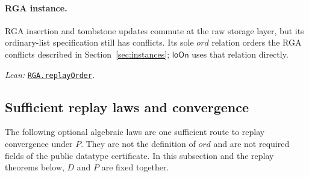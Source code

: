 \documentclass[11pt]{article}
\theoremstyle{definition}
\newcommand{\loOn}{\mathsf{loOn}}
\newcommand{\src}[2]{\href{../../#1}{\texttt{#2}}}
\newcommand{\anchor}[2]{\par\smallskip\noindent\emph{Lean: }\src{#1}{#2}.}
\begin{document}
\paragraph{RGA instance.}
RGA insertion and tombstone updates commute at the raw storage layer, but its
ordinary-list specification still has conflicts. Its sole $ord$ relation
orders the RGA conflicts described in Section~\ref{sec:instances}; $\loOn$ uses that relation
directly.
\anchor{Sal/MRDTs/Instances/RGASequential.lean}{RGA.replayOrder}

\subsection{Sufficient replay laws and convergence}

The following optional algebraic laws are one sufficient route to replay
convergence under $P$. They are not the definition of $ord$ and are not
required fields of the public datatype certificate. In this subsection and
the replay theorems below, $D$ and $P$ are fixed together.
\end{document}
